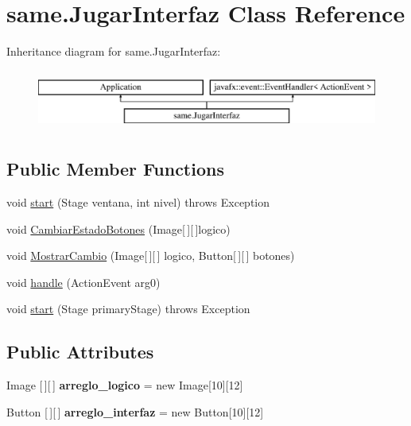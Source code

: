 \hypertarget{classsame_1_1_jugar_interfaz}{}\section{same.\+Jugar\+Interfaz Class Reference}
\label{classsame_1_1_jugar_interfaz}
Inheritance diagram for same.\+Jugar\+Interfaz\+:\begin{figure}[H]
\begin{center}
\leavevmode
\includegraphics[height=2.000000cm]{classsame_1_1_jugar_interfaz}
\end{center}
\end{figure}
\subsection*{Public Member Functions}
\begin{DoxyCompactItemize}
\item 
void \hyperlink{classsame_1_1_jugar_interfaz_a36f21d8cd6ccb7f9984c09659ec5b35f}{start} (Stage ventana, int nivel)  throws Exception 
\item 
void \hyperlink{classsame_1_1_jugar_interfaz_a9ec4401f9c331df554db86938ccf50b8}{Cambiar\+Estado\+Botones} (Image\mbox{[}$\,$\mbox{]}\mbox{[}$\,$\mbox{]}logico)
\item 
void \hyperlink{classsame_1_1_jugar_interfaz_a81b2d95f6748dfe787b9b72e76a81aca}{Mostrar\+Cambio} (Image\mbox{[}$\,$\mbox{]}\mbox{[}$\,$\mbox{]} logico, Button\mbox{[}$\,$\mbox{]}\mbox{[}$\,$\mbox{]} botones)
\item 
void \hyperlink{classsame_1_1_jugar_interfaz_a917ce15a363f79c0d7428578cb36b85c}{handle} (Action\+Event arg0)
\item 
void \hyperlink{classsame_1_1_jugar_interfaz_ac8c1c753ea40ce008a638af34e91aeda}{start} (Stage primary\+Stage)  throws Exception 
\end{DoxyCompactItemize}
\subsection*{Public Attributes}
\begin{DoxyCompactItemize}
\item 
\mbox{\label{classsame_1_1_jugar_interfaz_a9058f937d1cd0d18eb627e30ee93bbe2}} 
Image \mbox{[}$\,$\mbox{]}\mbox{[}$\,$\mbox{]} {\bfseries arreglo\+\_\+logico} = new Image\mbox{[}10\mbox{]}\mbox{[}12\mbox{]}
\item 
\mbox{\label{classsame_1_1_jugar_interfaz_a6899655aaf4fe3b0da53d2b22feedec5}} 
Button \mbox{[}$\,$\mbox{]}\mbox{[}$\,$\mbox{]} {\bfseries arreglo\+\_\+interfaz} = new Button\mbox{[}10\mbox{]}\mbox{[}12\mbox{]}
\end{DoxyCompactItemize}


